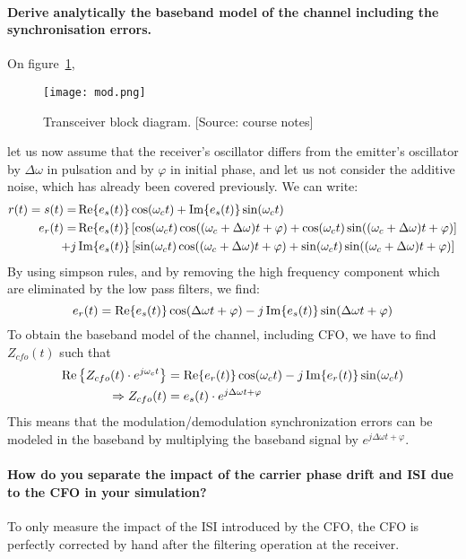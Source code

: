 \paragraph{Derive analytically the baseband model of the channel including the synchronisation errors.}
On figure~\ref{fig:mod},
\begin{figure}
  \centering
  \texttt{[image: mod.png]}
  \caption[Transceiver block diagram.]{Transceiver block diagram. [Source: course notes]\label{fig:mod}}
\end{figure}
let us now assume that the receiver's oscillator differs from the emitter's oscillator by $\Delta \omega$ in pulsation and by $\varphi$ in initial phase, and let us not consider the additive noise, which has already been covered previously.
We can write:
\begin{align*}
  r(t) = s(t) = &\operatorname{Re} \{e_s(t)\} \cos(\omega_c t) + \operatorname{Im} \{e_s(t)\} \sin ( \omega_c t)\\
  e_r(t) = &\operatorname{Re} \{e_s(t)\} \left [ \cos(\omega_c t)\cos((\omega_c + \Delta\omega) t + \varphi) + \cos(\omega_c t)\sin((\omega_c + \Delta\omega) t + \varphi) \right ] \\
  +j &\operatorname{Im} \{e_s(t)\} \left [ \sin(\omega_c t)\cos((\omega_c + \Delta\omega) t + \varphi) + \sin(\omega_c t)\sin((\omega_c + \Delta\omega) t + \varphi) \right ]
\end{align*}
By using simpson rules, and by removing the high frequency component which are eliminated by the low pass filters, we find:
\[
e_r(t) = \operatorname{Re}\{e_s(t)\} \cos(\Delta \omega t + \varphi) - j\operatorname{Im}\{e_s(t)\} \sin(\Delta \omega t + \varphi)
\]
To obtain the baseband model of the channel, including CFO, we have to find $Z_{cfo}(t)$ such that
\begin{align*}
  \operatorname{Re} \left \{Z_{cfo}(t)\cdot e^{j\omega_c t} \right \} &= \operatorname{Re}\{e_r(t)\} \cos(\omega_c t) - j \operatorname{Im} \{ e_r(t) \} \sin(\omega_c t)\\
  \Rightarrow Z_{cfo}(t) &= e_s(t)\cdot e^{j\Delta \omega t + \varphi}
\end{align*}
This means that the modulation/demodulation synchronization errors can be modeled in the baseband by multiplying the baseband signal by $e^{j\Delta \omega t + \varphi}$.

\paragraph{How do you separate the impact of the carrier phase drift and ISI due to the CFO in your simulation?}
To only measure the impact of the ISI introduced by the CFO, the CFO is perfectly corrected by hand after the filtering operation at the receiver.

